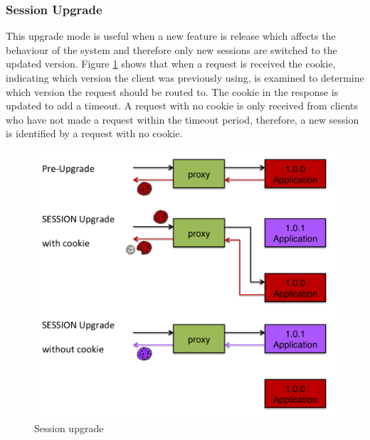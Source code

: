\documentclass[a4paper,11pt,twoside]{report}
\begin{document}
\subsubsection*{Session Upgrade}
This upgrade mode is useful when a new feature is release which affects the behaviour of the system and therefore only new sessions are switched to the updated version. Figure \ref{session_upgrade} shows that when a request is received the cookie, indicating which version the client was previously using, is examined to determine which version the request should be routed to.  The cookie in the response is updated to add a timeout.  A request with no cookie is only received from clients who have not made a request within the timeout period, therefore, a new session is identified by a request with no cookie.

   
\begin{figure}[!ht]
  \centering
     \includegraphics[scale=0.30]{session_upgrade}
  \caption{Session upgrade}
  \label{session_upgrade}
\end{figure}

\clearpage
\end{document}
